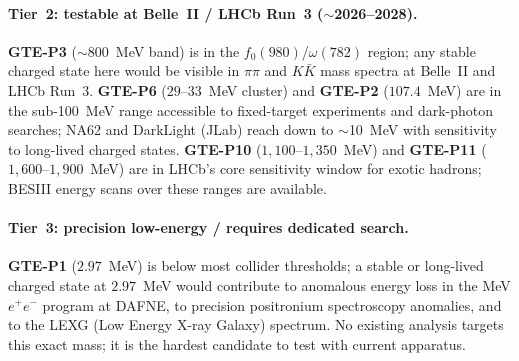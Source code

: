 \documentclass[12pt]{article}
\numberwithin{equation}{section}
\begin{document}
\paragraph{Tier~2: testable at Belle~II / LHCb Run~3 ($\sim$2026--2028).}
\textbf{GTE-P3} ($\sim$800~MeV band) is in the $f_0(980)$/$\omega(782)$
region; any stable charged state here would be visible in $\pi\pi$ and
$K\bar{K}$ mass spectra at Belle~II and LHCb Run~3.
\textbf{GTE-P6} ($29$--$33$~MeV cluster) and \textbf{GTE-P2}
($107.4$~MeV) are in the sub-100~MeV range accessible to
fixed-target experiments and dark-photon searches; NA62 and DarkLight
(\mbox{JLab}) reach down to $\sim$10~MeV with sensitivity to
long-lived charged states.
\textbf{GTE-P10} ($1{,}100$--$1{,}350$~MeV) and \textbf{GTE-P11}
($1{,}600$--$1{,}900$~MeV) are in LHCb's core sensitivity window for
exotic hadrons; BESIII energy scans over these ranges are available.

\paragraph{Tier~3: precision low-energy / requires dedicated search.}
\textbf{GTE-P1} ($2.97$~MeV) is below most collider thresholds; a
stable or long-lived charged state at $2.97$~MeV would contribute to
anomalous energy loss in the MeV$e^+e^-$ program at DAFNE, to
precision positronium spectroscopy anomalies, and to the LEXG (Low
Energy X-ray Galaxy) spectrum.  No existing analysis targets this exact
mass; it is the hardest candidate to test with current apparatus.
\end{document}
